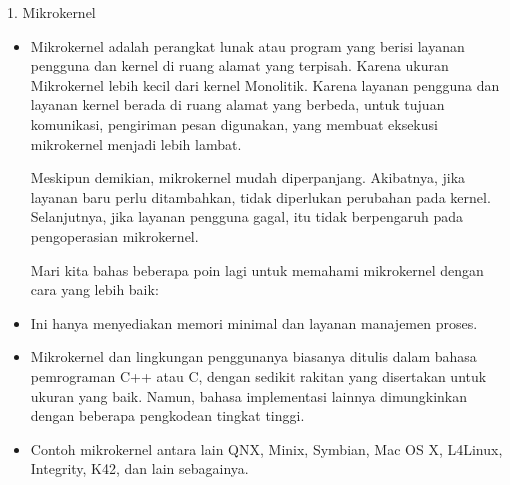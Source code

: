\documentclass{beamer}
\begin{document}
	\begin{frame}{1. Mikrokernel}
		\begin{itemize}
			
			\item Mikrokernel adalah perangkat lunak atau program yang berisi layanan pengguna dan kernel di ruang alamat yang terpisah. Karena ukuran Mikrokernel lebih kecil dari kernel Monolitik. Karena layanan pengguna dan layanan kernel berada di ruang alamat yang berbeda, untuk tujuan komunikasi, pengiriman pesan digunakan, yang membuat eksekusi mikrokernel menjadi lebih lambat.
			
			Meskipun demikian, mikrokernel mudah diperpanjang. Akibatnya, jika layanan baru perlu ditambahkan, tidak diperlukan perubahan pada kernel. Selanjutnya, jika layanan pengguna gagal, itu tidak berpengaruh pada pengoperasian mikrokernel.
			
			Mari kita bahas beberapa poin lagi untuk memahami mikrokernel dengan cara yang lebih baik: 
			
			
			\item Ini hanya menyediakan memori minimal dan layanan manajemen proses.
			
			\item Mikrokernel dan lingkungan penggunanya biasanya ditulis dalam bahasa pemrograman C++ atau C, dengan sedikit rakitan yang disertakan untuk ukuran yang baik. Namun, bahasa implementasi lainnya dimungkinkan dengan beberapa pengkodean tingkat tinggi.
			
			\item Contoh mikrokernel antara lain QNX, Minix, Symbian, Mac OS X, L4Linux, Integrity, K42, dan lain sebagainya.
		\end{itemize}	
	\end{frame}
		
\end{document}
